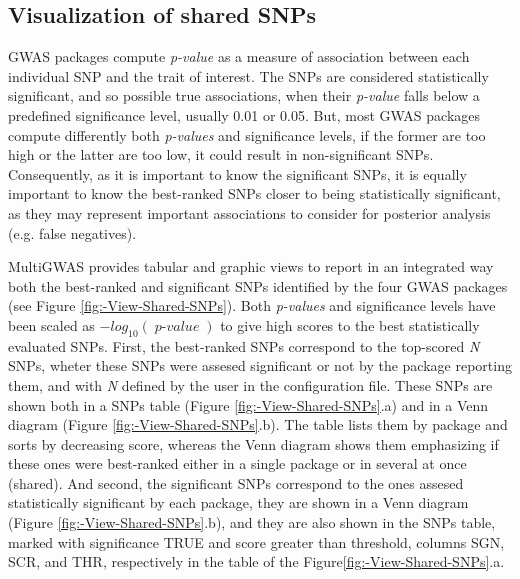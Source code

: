 \documentclass{article}
\newcommand{\mathB}[1]{{\operatorname{\mathit{#1}}}}
\begin{document}
\subsection{Visualization of shared SNPs}
GWAS packages compute \emph{p-value }as a measure of association between each individual SNP and the trait of interest. The SNPs are considered statistically significant, and so possible true associations, when their \emph{p-value }falls below a predefined significance level, usually 0.01 or 0.05. But, most GWAS packages compute differently both \emph{p-values }and significance levels, if the former are too high or the latter are too low, it could result in non-significant SNPs. Consequently, as it is important to know the significant SNPs, it is equally important to know the best-ranked SNPs closer to being statistically significant, as they may represent important associations to consider for posterior analysis (e.g. false negatives).

MultiGWAS provides tabular and graphic views to report in an integrated way both the best-ranked and significant SNPs identified by the four GWAS packages (see Figure \ref{fig:-View-Shared-SNPs}). Both \emph{p-values} and significance levels have been scaled as $-log_{10}(\mathB{p-value})$ to give high scores to the best statistically evaluated SNPs. First, the best-ranked SNPs correspond to the top-scored \emph{N} SNPs, wheter these SNPs were assesed significant or not by the package reporting them, and with\emph{ N} defined by the user in the configuration file. These SNPs are shown both in a SNPs table (Figure \ref{fig:-View-Shared-SNPs}.a) and in a Venn diagram (Figure \ref{fig:-View-Shared-SNPs}.b). The table lists them by package and sorts by decreasing score, whereas the Venn diagram shows them emphasizing if these ones were best-ranked either in a single package or in several at once (shared). And second, the significant SNPs correspond to the ones assesed statistically significant by each package, they are shown in a Venn diagram (Figure \ref{fig:-View-Shared-SNPs}.b), and they are also shown in the SNPs table, marked with significance TRUE and score greater than threshold, columns SGN, SCR, and THR, respectively in the table of the Figure\ref{fig:-View-Shared-SNPs}.a.
\end{document}
